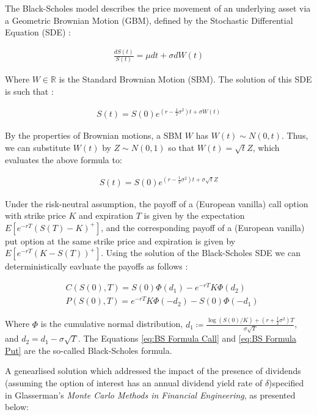 The Black-Scholes model describes the price movement of an underlying asset via a Geometric Brownian Motion (GBM), defined by the Stochastic Differential Equation (SDE) \cite{BS1973}:

\begin{align} \label{eq:BS Original}
\frac{dS(t)}{S(t)} = \mu dt + \sigma dW(t)
\end{align}

Where $W \in \mathbb{R}$ is the Standard Brownian Motion (SBM). The solution of this SDE is such that \cite{Glasserman2003}:

\begin{align}
S(t) = S(0) e^{(r-\frac{1}{2}\sigma^2)t + \sigma W(t)}
\end{align}

By the properties of Brownian motions, a SBM $W$ has $W(t) \sim N(0,t)$. Thus, we can substitute $W(t)$ by $Z \sim N(0,1)$ so that $W(t) = \sqrt{t}Z$, which evaluates the above formula to:

\begin{align} \label{eq:BS Normal RV}
S(t) = S(0) e^{(r-\frac{1}{2}\sigma^2)t + \sigma \sqrt{t}Z}
\end{align}

Under the risk-neutral assumption, the payoff of a (European vanilla) call option with strike price $K$ and expiration $T$ is given by the expectation $E[e^{-rT}(S(T)-K)^+]$, and the corresponding payoff of a (European vanilla) put option at the same strike price and expiration is given by $E[e^{-rT}(K-S(T))^+]$. Using the solution of the Black-Scholes SDE we can deterministically eavluate the payoffs as follows \cite{Higham2004}:

\begin{align}
&C(S(0), T) = S(0)\Phi(d_1) - e^{-rT}K\Phi(d_2) \label{eq:BS Formula Call} \\ 
&P(S(0), T) = e^{-rT}K\Phi(-d_2) - S(0)\Phi(-d_1) \label{eq:BS Formula Put}
\end{align}

Where $\Phi$ is the cumulative normal distribution, $d_1 \coloneqq \frac{\log(S(0)/K)+(r+\frac{1}{2}\sigma^2)T}{\sigma\sqrt{T}}$, and $d_2 = d_1 - \sigma\sqrt{T}$. The Equations \ref{eq:BS Formula Call} and \ref{eq:BS Formula Put} are the so-called Black-Scholes formula.

A genearlised solution which addressed the impact of the presence of dividends (assuming the option of interest has an annual dividend yield rate of $\delta$)specified in Glasserman's \textit{Monte Carlo Methods in Financial Engineering}, as presented below:

